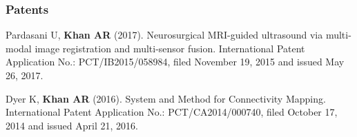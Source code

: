 \subsubsection*{Patents}
\begingroup
\renewcommand{\section}[2]{}%
\begin{thebibliography}{99}

\setcounter{enumi}{0}
 Pardasani U, \textbf{Khan AR} (2017). Neurosurgical MRI-guided ultrasound via multi-modal image registration and multi-sensor fusion.  International Patent Application No.: PCT/IB2015/058984, filed November 19, 2015 and issued May 26, 2017.

 Dyer K, \textbf{Khan AR} (2016). System and Method for Connectivity Mapping.  International Patent Application No.: PCT/CA2014/000740, filed October 17, 2014 and issued April 21, 2016.

\end{thebibliography}
\endgroup



